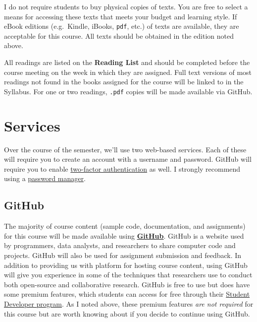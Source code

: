 \documentclass[
]{book}
\begin{document}
I do not require students to buy physical copies of texts. You are free to select a means for accessing these texts that meets your budget and learning style. If eBook editions (e.g.~Kindle, iBooks, \texttt{pdf}, etc.) of texts are available, they are acceptable for this course. All texts should be obtained in the edition noted above.

All readings are listed on the \textbf{Reading List} and should be completed before the course meeting on the week in which they are assigned. Full text versions of most readings not found in the books assigned for the course will be linked to in the Syllabus. For one or two readings, \texttt{.pdf} copies will be made available via GitHub.

\hypertarget{services}{%
\section{Services}\label{services}}

Over the course of the semester, we'll use two web-based services. Each of these will require you to create an account with a username and password. GitHub will require you to enable \href{https://en.wikipedia.org/wiki/Multi-factor_authentication}{two-factor authentication} as well. I strongly recommend using a \href{https://lifehacker.com/5529133/five-best-password-managers}{password manager}.

\hypertarget{github}{%
\subsection{GitHub}\label{github}}

The majority of course content (sample code, documentation, and assignments) for this course will be made available using \textbf{\href{http://www.github.com}{GitHub}}. GitHub is a website used by programmers, data analysts, and researchers to share computer code and projects. GitHub will also be used for assignment submission and feedback. In addition to providing us with platform for hosting course content, using GitHub will give you experience in some of the techniques that researchers use to conduct both open-source and collaborative research. GitHub is free to use but does have some premium features, which students can access for free through their \href{https://education.github.com/pack/}{Student Developer program}. As I noted above, these premium features \emph{are not required} for this course but are worth knowing about if you decide to continue using GitHub.
\end{document}
